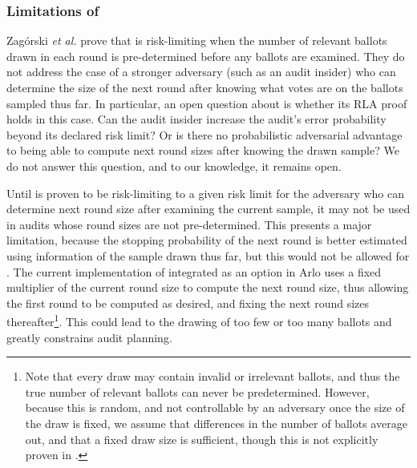 \subsubsection{Limitations of \Minerva}
Zag\'{o}rski {\em et al.}  prove that \Minerva \cite{usenix_minerva} is risk-limiting when the number of relevant ballots drawn in each round is pre-determined before any ballots are examined. They do not address the case of a stronger adversary (such as an audit insider) who can determine the size of the next round after knowing what votes are on the ballots sampled thus far. In particular, an open question about \Minerva is whether its RLA proof holds in this case. Can the audit insider increase the audit's error probability beyond its declared risk limit? Or is there no probabilistic adversarial advantage to being able to compute next round sizes after knowing the drawn sample? We do not answer this question, and to our knowledge, it remains open. 

Until \Minerva is proven to be risk-limiting to a given risk limit for the adversary who can determine next round size after examining the current sample, it may not be used in audits whose round sizes are not pre-determined. This presents a major limitation, because the stopping probability of the next round is better estimated using information of the sample drawn thus far, but this would not be allowed for \Minerva. The current implementation of \Minerva integrated as an option in Arlo uses a fixed multiplier of the current round size to compute the next round size, thus allowing the first round to be computed as desired, and fixing the next round sizes thereafter\footnote{Note that every draw may contain invalid or irrelevant ballots, and thus the true number of relevant ballots can never be predetermined. However, because this is random, and not controllable by an adversary once the size of the draw is fixed, we assume that differences in the number of ballots average out, and that a fixed draw size is sufficient, though this is not explicitly proven in \cite{usenix_minerva}.}. This could lead to the drawing of too few or too many ballots and greatly constrains audit planning.  


